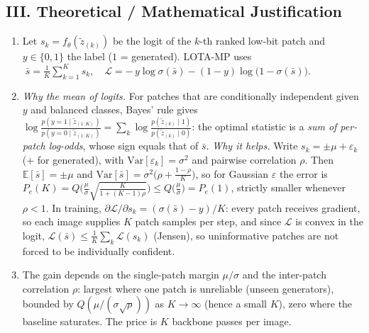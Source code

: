 \documentclass[8pt,a4paper]{article}
\begin{document}
\subsection*{III. Theoretical / Mathematical Justification}
\begin{enumerate}
    \item Let $s_k=f_\theta(\tilde z_{(k)})$ be the logit of the $k$-th ranked low-bit patch and $y\in\{0,1\}$ the label ($1$ = generated). LOTA-MP uses
    $\;\bar s=\frac1K\sum_{k=1}^{K}s_k,\quad \mathcal L=-\,y\log\sigma(\bar s)-(1-y)\log\big(1-\sigma(\bar s)\big).$
    \item \emph{Why the mean of logits.} For patches that are conditionally independent given $y$ and balanced classes, Bayes' rule gives $\log\frac{p(y=1\mid \tilde z_{(1:K)})}{p(y=0\mid \tilde z_{(1:K)})}=\sum_k\log\frac{p(\tilde z_{(k)}\mid 1)}{p(\tilde z_{(k)}\mid 0)}$: the optimal statistic is a \emph{sum of per-patch log-odds}, whose sign equals that of $\bar s$.
    \emph{Why it helps.} Write $s_k=\pm\mu+\varepsilon_k$ ($+$ for generated), with $\mathrm{Var}[\varepsilon_k]=\sigma^2$ and pairwise correlation $\rho$. Then $\mathbb E[\bar s]=\pm\mu$ and
    $\mathrm{Var}[\bar s]=\sigma^2\big(\rho+\tfrac{1-\rho}{K}\big)$, so for Gaussian $\varepsilon$ the error is
    $P_e(K)=Q\!\Big(\tfrac{\mu}{\sigma}\sqrt{\tfrac{K}{1+(K-1)\rho}}\Big)\le Q\!\big(\tfrac{\mu}{\sigma}\big)=P_e(1)$, strictly smaller whenever $\rho<1$.
    In training, $\partial\mathcal L/\partial s_k=(\sigma(\bar s)-y)/K$: every patch receives gradient, so each image supplies $K$ patch samples per step, and since $\mathcal L$ is convex in the logit, $\mathcal L(\bar s)\le\frac1K\sum_k\mathcal L(s_k)$ (Jensen), so uninformative patches are not forced to be individually confident.
    \item The gain depends on the single-patch margin $\mu/\sigma$ and the inter-patch correlation $\rho$: largest where one patch is unreliable (unseen generators), bounded by $Q(\mu/(\sigma\sqrt\rho))$ as $K\to\infty$ (hence a small $K$), zero where the baseline saturates. The price is $K$ backbone passes per image.
\end{enumerate}

\end{document}
